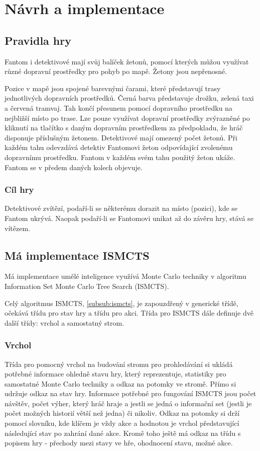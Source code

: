 \chapter{Návrh a implementace}

\section{Pravidla hry}\label{pravidla}

Fantom i detektivové mají svůj balíček žetonů, pomocí kterých můžou využívat různé dopravní
prostředky pro pohyb po mapě. Žetony jsou nepřenosné.

Pozice v mapě jsou spojené barevnými čarami, které představují trasy
jednotlivých dopravních prostředků. Černá barva představuje drožku,
zelená taxi a červená tramvaj. Tah končí přesunem pomocí dopravního
prostředku na nejbližší místo po trase. Lze pouze využívat dopravní
prostředky zvýrazněné po kliknutí na tlačítko s daným dopravním
prostředkem za předpokladu, že hráč disponuje příslušným žetonem.
Detektivové mají omezený počet žetonů. Při každém tahu odevzdává
detektiv Fantomovi žeton odpovídající zvolenému dopravnímu prostředku.
Fantom v každém svém tahu použitý žeton ukáže. Fantom se v předem daných kolech objevuje.

\subsection{Cíl hry}\label{cuxedl-hry}

Detektivové zvítězí, podaří-li se některému dorazit na místo (pozici),
kde se Fantom ukrývá. Naopak podaří-li se Fantomovi unikat až do závěru
hry, stává se vítězem.
\section{Má implementace ISMCTS}\label{sec:impl}
Má implementace umělé inteligence využívá Monte Carlo techniky v algoritmu Information Set Monte Carlo Tree Search (ISMCTS).

Celý algoritmus ISMCTS, \cref{subsub:ismcts}, je zapouzdřený v generické třídě, očekává třídu pro stav hry a třídu pro akci. Třída pro ISMCTS dále definuje dvě další třídy: vrchol a samostatný strom. 

\subsection{Vrchol}
Třída pro pomocný vrchol na budování stromu pro prohledávání si ukládá potřebné informace ohledně stavu hry, který reprezentuje, statistiky pro samostatné Monte Carlo techniky a odkaz na potomky ve stromě. Přímo si udržuje odkaz na stav hry. Informace potřebné pro fungování ISMCTS jsou počet návštěv, počet výher, který hráč hraje a jestli se jedná o informační set (jestli je počet možných historií větší než jedna) či nikoliv. Odkaz na potomky si drží pomocí slovníku, kde klíčem je vždy akce a hodnotou je vrchol představující následující stav po zahrání dané akce. Kromě toho ještě má odkaz na třídu s popisem hry - přechody mezi stavy ve hře, ohodnocení stavu, možné akce.

